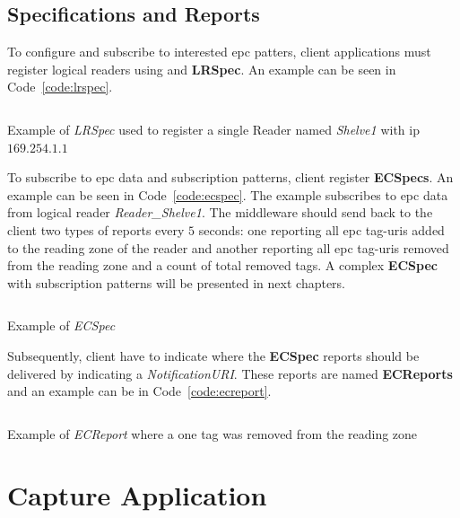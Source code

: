 \subsection{Specifications and Reports}

To configure and subscribe to interested \ac{epc} patters, client applications must register logical readers using and \textbf{LRSpec}. An example can be seen in Code~\ref{code:lrspec}.

\begin{listing}
    \inputminted[linenos, breaklines]{xml}{./code/sota/LRSpec.xml}
    \caption{Example of \textit{LRSpec} used to register a single Reader named \textit{Shelve1} with \ac{ip} $169.254.1.1$}
    \label{code:lrspec}
\end{listing}

To subscribe to \ac{epc} data and subscription patterns, client register \textbf{ECSpecs}. An example can be seen in Code~\ref{code:ecspec}. The example subscribes to \ac{epc} data from logical reader \textit{Reader\_Shelve1}. The middleware should send back to the client two types of reports every $5$ seconds: one reporting all \ac{epc} tag-\acp{uri} added to the reading zone of the reader and another reporting all \ac{epc} tag-\acp{uri} removed from the reading zone and a count of total removed tags.
A complex \textbf{ECSpec} with subscription patterns will be presented in next chapters.

\begin{listing}
    \inputminted[linenos, breaklines]{xml}{./code/sota/ECSpec.xml}
    \caption{Example of \textit{ECSpec}}
    \label{code:ecspec}
\end{listing}

Subsequently, client have to indicate where the \textbf{ECSpec} reports should be delivered by indicating a \textit{NotificationURI}.
These reports are named \textbf{ECReports} and an example can be in Code~\ref{code:ecreport}.

\begin{listing}
    \inputminted[linenos, breaklines]{xml}{./code/sota/EC_REPORT_deletions.xml}
    \caption{Example of \textit{ECReport} where a one tag was removed from the reading zone}
    \label{code:ecreport}
\end{listing}

\section{Capture Application}

